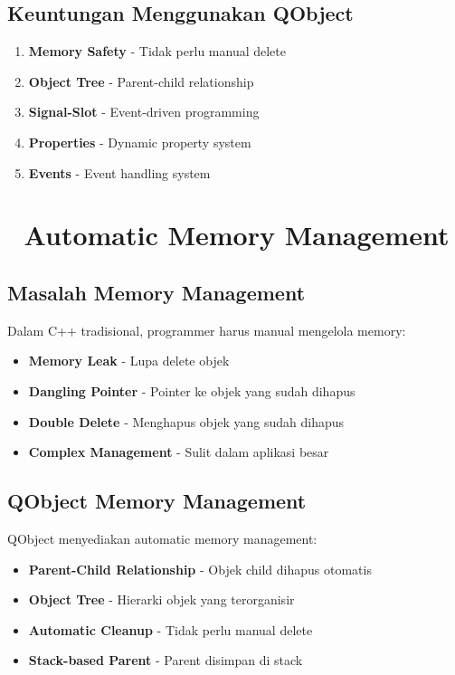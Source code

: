 \subsection{Keuntungan Menggunakan QObject}

\begin{enumerate}
\item \textbf{Memory Safety} - Tidak perlu manual delete
\item \textbf{Object Tree} - Parent-child relationship
\item \textbf{Signal-Slot} - Event-driven programming
\item \textbf{Properties} - Dynamic property system
\item \textbf{Events} - Event handling system
\end{enumerate}

\section{🧠 Automatic Memory Management}

\subsection{Masalah Memory Management}

Dalam C++ tradisional, programmer harus manual mengelola memory:
\begin{itemize}
\item \textbf{Memory Leak} - Lupa delete objek
\item \textbf{Dangling Pointer} - Pointer ke objek yang sudah dihapus
\item \textbf{Double Delete} - Menghapus objek yang sudah dihapus
\item \textbf{Complex Management} - Sulit dalam aplikasi besar
\end{itemize}

\subsection{QObject Memory Management}

QObject menyediakan automatic memory management:

\begin{itemize}
\item \textbf{Parent-Child Relationship} - Objek child dihapus otomatis
\item \textbf{Object Tree} - Hierarki objek yang terorganisir
\item \textbf{Automatic Cleanup} - Tidak perlu manual delete
\item \textbf{Stack-based Parent} - Parent disimpan di stack
\end{itemize}

